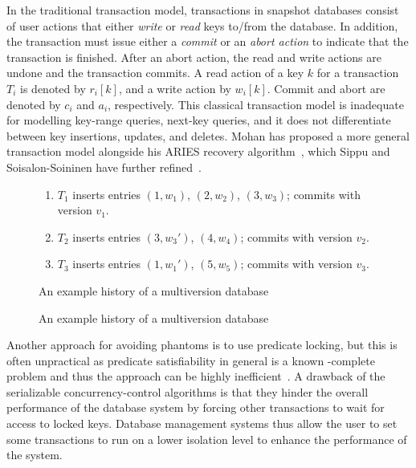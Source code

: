 In the traditional transaction model, transactions in snapshot
databases consist of user actions that either \emph{write} or
\emph{read} keys to/from the database.
In addition, the transaction must issue either a \emph{commit} or an
\emph{abort action} to indicate that the transaction is finished.
After an abort action, the read and write actions are undone and the
transaction commits.  
A read action of a key $k$ for a transaction $T_i$ is denoted by 
$r_i[k]$, and a write action by $w_i[k]$.
Commit and abort are denoted by $c_i$ and $a_i$, respectively.
This classical transaction model is inadequate for
modelling key-range queries, next-key queries, and it does not
differentiate between key insertions, updates, and deletes.
Mohan has proposed a more general transaction model alongside his 
ARIES recovery algorithm~\cite{mohan:1990:aries-kvl,mohan:1992:aries-im},
which Sippu and Soisalon-Soininen have
further refined~\cite{sippu:2001:theory}. 

\begin{figure}
\begin{center}
\begin{enumerate}
\setlength{\itemsep}{0pt}
  \item $T_1$ inserts entries $(1, w_1)$, $(2, w_2)$, $(3,
  w_3)$; commits with version $v_1$.
  \item $T_2$ inserts entries $(3, w_3')$, $(4, w_4)$; commits
  with version $v_2$.
  \item $T_3$ inserts entries $(1, w_1')$, $(5, w_5)$; commits
  with version $v_3$.
\end{enumerate}
\caption{An example history of a multiversion database}
\label{fig:mv-tx-workload-old}
\end{center}
\end{figure}

\begin{figure}
\begin{center}

\caption{An example history of a multiversion database}
\label{fig:mv-tx-workload}
\end{center}
\end{figure}

Another approach for avoiding phantoms is to use predicate locking,
but this is often unpractical as predicate satisfiability in general
is a known \NP-complete problem and thus the approach can be highly
inefficient~\cite{gray:1993:transactionprocessing}.
A drawback of the serializable concurrency-control algorithms is that
they hinder the overall performance of the database system by forcing
other transactions to wait for access to locked keys.
Database management systems thus allow the user to set some
transactions to run on a lower isolation level to enhance the
performance of the system.

